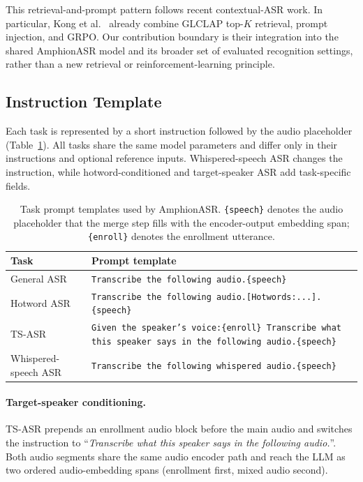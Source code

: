 This retrieval-and-prompt pattern follows recent contextual-ASR work.
In particular, Kong et al.~\cite{lakomkin2025contextual} already combine
GLCLAP top-$K$ retrieval, prompt injection, and GRPO. Our contribution
boundary is their integration into the shared AmphionASR model and its
broader set of evaluated recognition settings, rather than a new
retrieval or reinforcement-learning principle.

\subsection{Instruction Template}
\label{subsec:prompt}

Each task is represented by a short instruction followed by the audio
placeholder (Table~\ref{tab:tasks}).
All tasks share the same model parameters and differ only in their
instructions and optional reference inputs.
Whispered-speech ASR changes the instruction, while hotword-conditioned
and target-speaker ASR add task-specific fields.

\begin{table}[t]
  \caption{Task prompt templates used by AmphionASR. \texttt{\{speech\}}
    denotes the audio placeholder that the merge step fills with the
    encoder-output embedding span; \texttt{\{enroll\}} denotes the
    enrollment utterance.}
  \label{tab:tasks}
  \centering
  \small
  \setlength{\tabcolsep}{4pt}
  \begin{tabular}{lp{9.6cm}}
    \toprule
    Task & Prompt template \\
    \midrule
    General ASR       & \texttt{Transcribe the following audio.\{speech\}} \\
    Hotword ASR      & \texttt{Transcribe the following audio.[Hotwords:...].\{speech\}} \\
    TS-ASR           & \texttt{Given the speaker's voice:\{enroll\} Transcribe what this speaker says in the following audio.\{speech\}} \\
    Whispered-speech ASR & \texttt{Transcribe the following whispered audio.\{speech\}} \\
    \bottomrule
  \end{tabular}
\end{table}

\paragraph{Target-speaker conditioning.}
TS-ASR prepends an enrollment audio block before the main audio and
switches the instruction to ``\textit{Transcribe what this speaker
says in the following audio.}''. Both audio segments share the same
audio encoder path and reach the LLM as two ordered audio-embedding
spans (enrollment first, mixed audio second).

